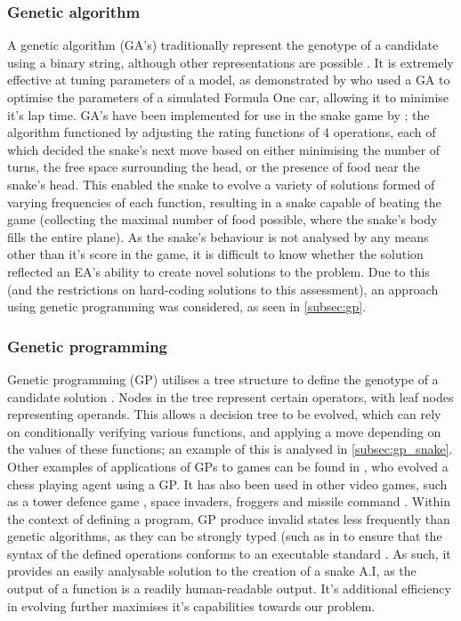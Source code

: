 \documentclass[british,10pt,a4paper]{article}
\begin{document}
\subsubsection{Genetic algorithm}
A genetic algorithm (GA's) traditionally represent the genotype of a candidate using a binary string, although other representations are possible \cite{Whitley1994-tx}. It is extremely effective at tuning parameters of a model, as demonstrated by \citet{Wloch2004-vo} who used a GA to optimise the parameters of a simulated Formula One car, allowing it to minimise it's lap time. GA's have been implemented for use in the snake game by \citet{Yeh2016-ts}; the algorithm functioned by adjusting the rating functions of 4 operations, each of which decided the snake's next move based on either minimising the number of turns, the free space surrounding the head, or the presence of food near the snake's head. This enabled the snake to evolve a variety of solutions formed of varying frequencies of each function, resulting in a snake capable of beating the game (collecting the maximal number of food possible, where the snake's body fills the entire plane). As the snake's behaviour is not analysed by any means other than it's score in the game, it is difficult to know whether the solution reflected an EA's ability to create novel solutions to the problem. Due to this (and the restrictions on hard-coding solutions to this assessment), an approach using genetic programming was considered, as seen in \autoref{subsec:gp}.

\subsubsection{Genetic programming}
\label{subsec:gp}
Genetic programming (GP) utilises a tree structure to define the genotype of a candidate solution \cite{Cramer_undated-bj}. Nodes in the tree represent certain operators, with leaf nodes representing operands. This allows a decision tree to be evolved, which can rely on conditionally verifying various functions, and applying a move depending on the values of these functions; an example of this is analysed in \autoref{subsec:gp_snake}. Other examples of applications of GPs to games can be found in \citet{Hauptman2005-zg}, who evolved a chess playing agent using a GP. It has also been used in other video games, such as a tower defence game \cite{Leong2013-pu}, space invaders, froggers and missile command \cite{Jia2015-jk}. Within the context of defining a program, GP produce invalid states less frequently than genetic algorithms, as they can be strongly typed (such as in \cite{Jia2015-jk} to ensure that the syntax of the defined operations conforms to an executable standard \cite{Chen2012-ei}. As such, it provides an easily analysable solution to the creation of a snake A.I, as the output of a function is a readily human-readable output. It's additional efficiency in evolving further maximises it's capabilities towards our problem.
\end{document}
